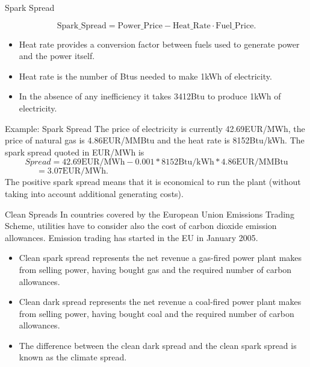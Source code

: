 {Spark Spread}

$$\text{Spark\_Spread}=\text{Power\_Price} - \text{Heat\_Rate}\cdot\text{Fuel\_Price}.$$
\vspace{0.2cm}
\begin{itemize}
  \item<1-> Heat rate provides a conversion factor between fuels used to generate power and the power itself.
  \item<2-> Heat rate is the number of Btus needed to make 1kWh of electricity.
  \item<3-> In the absence of any inefficiency it takes 3412Btu to produce 1kWh of electricity.
\end{itemize}




{Example: Spark Spread}
The price of electricity is currently 42.69EUR/MWh, the price of natural gas is 4.86EUR/MMBtu and the heat rate is 8152Btu/kWh. The spark spread quoted in EUR/MWh is
$$Spread=42.69\text{EUR/MWh}-0.001\ast8152\text{Btu/kWh}\ast4.86\text{EUR/MMBtu}$$
$\,\qquad\quad\;\;=3.07\text{EUR/MWh}.$\\
\vspace{0.2cm}
The positive spark spread means that it is economical to run the plant (without taking into account additional generating costs).



{Clean Spreads}
In countries covered by the European Union Emissions Trading Scheme, utilities have to consider also the cost of carbon dioxide emission allowances. Emission trading has started in the EU in January 2005.
\begin{itemize}
  \item Clean spark spread represents the net revenue a gas-fired power plant makes from selling power, having bought gas and the required number of carbon allowances.
  \item Clean dark spread represents the net revenue a coal-fired power plant makes from selling power, having bought coal and the required number of carbon allowances.
  \item The difference between the clean dark spread and the clean spark spread is known as the climate spread.
\end{itemize}




